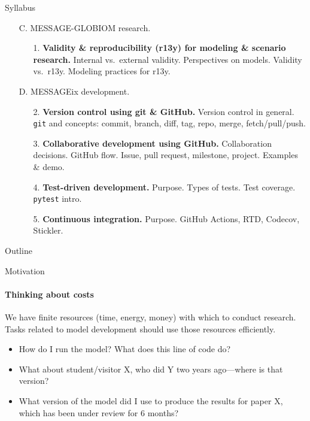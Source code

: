\documentclass[12pt,aspectratio=169]{beamer}
\begin{document}
\begin{frame}{Syllabus}

\begin{enumerate}
  \item [C.] MESSAGE-GLOBIOM research.
    \begin{enumerate}
      \item [1.] \textbf{Validity \& reproducibility (r13y) for modeling \& scenario research.} Internal vs.\ external validity. Perspectives on models. Validity vs.\ r13y. Modeling practices for r13y.
    \end{enumerate}

  \item [D.] MESSAGEix development.
    \begin{enumerate}
      \item [2.] \textbf{Version control using {\ttfamily git} \& GitHub.} Version control in general. \texttt{git} and concepts: commit, branch, diff, tag, repo, merge, fetch/pull/push.
      \item [3.] \textbf{Collaborative development using GitHub.} Collaboration decisions. GitHub flow. Issue, pull request, milestone, project. Examples \& demo.
      \item [4.] \textbf{Test-driven development.} Purpose. Types of tests. Test coverage. \texttt{pytest} intro.
      \item [5.] \textbf{Continuous integration.} Purpose. GitHub Actions, RTD, Codecov, Stickler.
    \end{enumerate}

\end{enumerate}


\end{frame}

\begin{frame}{Outline}
\tableofcontents[hideallsubsections]
\end{frame}

\begin{frame}{Motivation}
\framesubtitle{Thinking about costs}

We have finite resources (time, energy, money) with which to conduct research.
Tasks related to model development should use those resources efficiently.

\bigskip
{}

\begin{itemize}
  \item How do I run the model? What does this line of code do?
  \item What about student/visitor X, who did Y two years ago—where is that version?
  \item What version of the model did I use to produce the results for paper X, which has been under review for 6 months?
\end{itemize}

\end{frame}
\end{document}
